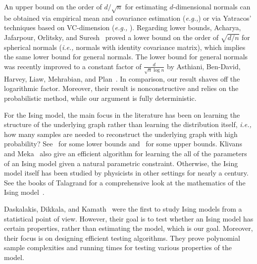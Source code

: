 \documentclass[letterpaper]{amsart}
\makeatletter
\newcommand*{\ie}{\emph{i.e.,}\@\xspace}
\newcommand*{\eg}{\emph{e.g.,}\@\xspace}
\numberwithin{thm}{section}
\theoremstyle{definition}
\theoremstyle{plain}
\makeatother
\begin{document}
An upper bound on the order of $d/\sqrt{n}$ for estimating
$d$-dimensional normals can be obtained via empirical mean and
covariance estimation (\eg \cite[Theorem~B.1]{2017-abbas}) or via
Yatracos' techniques based on VC-dimension (\eg
\cite[Theorem~13]{abbas-mixtures}).  Regarding lower bounds, Acharya,
Jafarpour, Orlitsky, and Suresh~\cite[Theorem~2]{acharya-lower-bound}
proved a lower bound on the order of $\sqrt{d/n}$ for spherical
normals (\ie normals with identity covariance matrix), which implies
the same lower bound for general normals. The lower bound for general
normals was recently improved to a constant factor of
$\frac{d}{\sqrt{n} \log n}$ by Asthiani, Ben-David, Harvey, Liaw,
Mehrabian, and Plan~\cite{2017-abbas}. In comparison, our result
shaves off the logarithmic factor. Moreover, their result is
nonconstructive and relies on the probabilistic method, while our
argument is fully deterministic.

For the Ising model, the main focus in the literature has been on
learning the structure of the underlying graph rather than learning
the distribution itself, \ie how many samples are needed to
reconstruct the underlying graph with high probability?
See~\cite{Santhanam-lower,Shanmugam-lower} for some lower bounds
and~\cite{Hamilton-upper,Klivans-upper} for some upper bounds. Klivans
and Meka~\cite{Klivans-upper} also give an efficient algorithm for
learning the all of the parameters of an Ising model given a natural
parametric constraint. Otherwise, the Ising model itself has been
studied by physicists in other settings for nearly a century. See the
books of Talagrand for a comprehensive look at the mathematics of the
Ising model~\cite{talagrand-2003, talagrand-2010, talagrand-2011}.

Daskalakis, Dikkala, and Kamath~\cite{costis-2018} were the first to
study Ising models from a statistical point of view. However, their
goal is to test whether an Ising model has certain properties, rather
than estimating the model, which is our goal. Moreover, their focus is
on designing efficient testing algorithms. They prove polynomial
sample complexities and running times for testing various properties
of the model.
\end{document}
